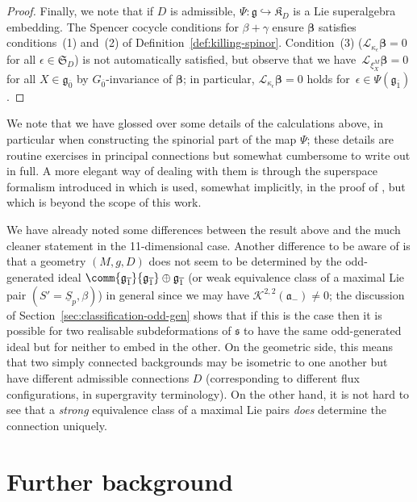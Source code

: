 \documentclass[pdftex]{sigma}
\numberwithin{equation}{section}
\newcommand{\fa}{\mathfrak{a}}
\newcommand{\fg}{\mathfrak{g}}
\newcommand{\fs}{\mathfrak{s}}
\newcommand{\fK}{\mathfrak{K}}
\newcommand{\fS}{\mathfrak{S}}
\newcommand{\eL}{\mathscr{L}}
\newcommand{\cK}{\mathcal{K}}
\newcommand{\Sbundle}{\underline{S}}
\newcommand{\1}{\mathbbm{1}}
\begin{document}
\begin{proof}
	Finally, we note that if $D$ is admissible, $\Psi\colon\fg\hookrightarrow\fK_D$ is a Lie superalgebra embedding. The Spencer cocycle conditions for $\beta+\gamma$ ensure $\boldsymbol{\beta}$ satisfies conditions~(1) and~(2) of Definition~\ref{def:killing-spinor}. Condition~(3) ($\eL_{\kappa_\epsilon}\boldsymbol{\beta}=0$ for all $\epsilon\in\fS_D$) is not automatically satisfied, but observe that we have~$\eL_{\xi^M_X}\boldsymbol{\beta}=0$ for all $X\in\fg_{\overline 0}$ by $G_{\overline 0}$-invariance of $\boldsymbol{\beta}$; in particular, $\eL_{\kappa_\epsilon}\boldsymbol{\beta}=0$ holds for~${\epsilon\in\Psi(\fg_{\overline 1})}$.
\end{proof}

We note that we have glossed over some details of the calculations above, in particular when constructing the spinorial part of the map $\Psi$; these details are routine exercises in principal connections but somewhat cumbersome to write out in full. A more elegant way of dealing with them is through the superspace formalism introduced in \cite{Santi2010} which is used, somewhat implicitly, in the proof of \cite[Theorem~13]{Figueroa-OFarrill2017_1}, but which is beyond the scope of this work.

\begin{Remark}
We have already noted some differences between the result above and the much cleaner statement in the 11-dimensional case. Another difference to be aware of is that a geometry $(M,g,D)$ does not seem to be determined by the odd-generated ideal $\comm{\fg_{\overline 1}}{\fg_{\overline 1}}\oplus\fg_{\overline 1}$ (or weak equivalence class of a maximal Lie pair $(S'=\Sbundle_p,\beta)$) in general since we may have $\cK^{2,2}(\fa_-)\neq 0$; the discussion of Section~\ref{sec:classification-odd-gen} shows that if this is the case then it is possible for two realisable subdeformations of $\fs$ to have the same odd-generated ideal but for neither to embed in the other. On the geometric side, this means that two simply connected backgrounds may be isometric to one another but have different admissible connections $D$ (corresponding to different flux configurations, in supergravity terminology). On the other hand, it is not hard to see that a \emph{strong} equivalence class of a maximal Lie pairs \emph{does} determine the connection uniquely.
\end{Remark}

\appendix

\section{Further background}
\label{app:further-background}
\end{document}
